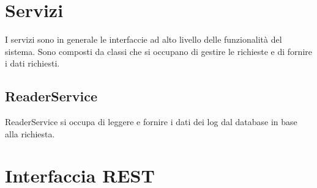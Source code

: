 \section{Servizi}

I servizi sono in generale le interfaccie ad alto livello delle funzionalità del sistema. Sono composti da classi che si occupano di gestire le richieste e di fornire i dati richiesti.

\subsection{ReaderService}
ReaderService si occupa di leggere e fornire i dati dei log dal database in base alla richiesta.

\section{Interfaccia REST}